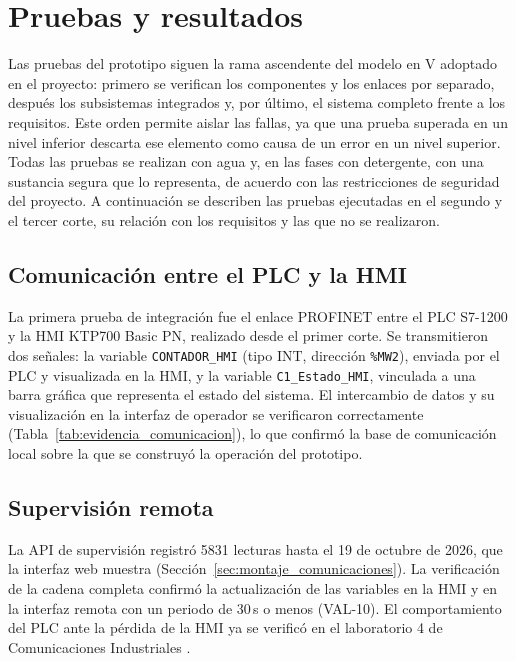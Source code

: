 \section{Pruebas y resultados}\label{sec:montaje_pruebas}

Las pruebas del prototipo siguen la rama ascendente del modelo en V adoptado en el proyecto: primero se verifican los componentes y los enlaces por separado, después los subsistemas integrados y, por último, el sistema completo frente a los requisitos. Este orden permite aislar las fallas, ya que una prueba superada en un nivel inferior descarta ese elemento como causa de un error en un nivel superior. Todas las pruebas se realizan con agua y, en las fases con detergente, con una sustancia segura que lo representa, de acuerdo con las restricciones de seguridad del proyecto. A continuación se describen las pruebas ejecutadas en el segundo y el tercer corte, su relación con los requisitos y las que no se realizaron.

\subsection{Comunicación entre el PLC y la HMI}

La primera prueba de integración fue el enlace PROFINET entre el PLC S7-1200 y la HMI KTP700 Basic PN, realizado desde el primer corte. Se transmitieron dos señales: la variable \texttt{CONTADOR\_HMI} (tipo INT, dirección \texttt{\%MW2}), enviada por el PLC y visualizada en la HMI, y la variable \texttt{C1\_Estado\_HMI}, vinculada a una barra gráfica que representa el estado del sistema. El intercambio de datos y su visualización en la interfaz de operador se verificaron correctamente (Tabla~\ref{tab:evidencia_comunicacion}), lo que confirmó la base de comunicación local sobre la que se construyó la operación del prototipo.

\subsection{Supervisión remota}

La API de supervisión registró 5831 lecturas hasta el 19 de octubre de 2026, que la interfaz web muestra (Sección~\ref{sec:montaje_comunicaciones}). La verificación de la cadena completa confirmó la actualización de las variables en la HMI y en la interfaz remota con un periodo de 30\,s o menos (VAL-10). El comportamiento del PLC ante la pérdida de la HMI ya se verificó en el laboratorio 4 de Comunicaciones Industriales \cite{ruiz2026lab4}.

